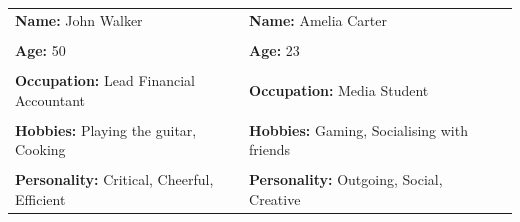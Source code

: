 \documentclass[12pt]{article}
\theoremstyle{plain}
\theoremstyle{definition}
\begin{document}
\begin{table}[ht]
\centering
\begin{tabular}{|l|l|ll}
\cline{1-2}
\textbf{Name:} John Walker                                              & \textbf{Name:} Amelia Carter                                          &  &  \\
 &          &  &  \\
\textbf{Age:} 50                                                        & \textbf{Age:} 23                                                      &  &  \\
               &            &  &  \\
\textbf{Occupation:} Lead Financial Accountant                                                                                                                                                                                                                                                          & \textbf{Occupation:} Media Student                                                                                                                                                                                                                             &  &  \\
     &         &  &  \\
\textbf{Hobbies:} Playing the guitar, Cooking                                                                                                                                                                                                                                                           & \textbf{Hobbies:} Gaming, Socialising with friends                                                                                                                                                                                                             &  &  \\
            &               &  &  \\
\textbf{Personality:} Critical, Cheerful, Efficient                                                                                                                                                                                                                                                     & \textbf{Personality:} Outgoing, Social, Creative                                                                                                                                                                                                               &  &  \\

\end{tabular}
\end{table}
\end{document}

